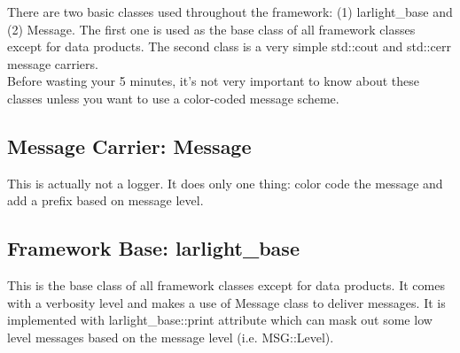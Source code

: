 
There are two basic classes used throughout the framework: 
(1) {\ttfamily larlight\_base} and (2) {\ttfamily Message}.
The first one is used as the base class of all framework classes except for data products.
The second class is a very simple {\ttfamily std::cout} and {\ttfamily std::cerr} message carriers.\\

Before wasting your 5 minutes, it's not very important to know about these classes unless you want to
use a color-coded message scheme.

\subsection{Message Carrier: {\ttfamily Message}}
This is actually not a logger.
It does only one thing: color code the message and add a prefix based on message level.

\subsection{Framework Base: {\ttfamily larlight\_base}}
This is the base class of all framework classes except for data products.
It comes with a verbosity level and makes a use of {\ttfamily Message} class
to deliver messages. It is implemented with {\ttfamily larlight\_base::print} attribute
which can mask out some low level messages based on the message level (i.e. {\ttfamily MSG::Level}).


